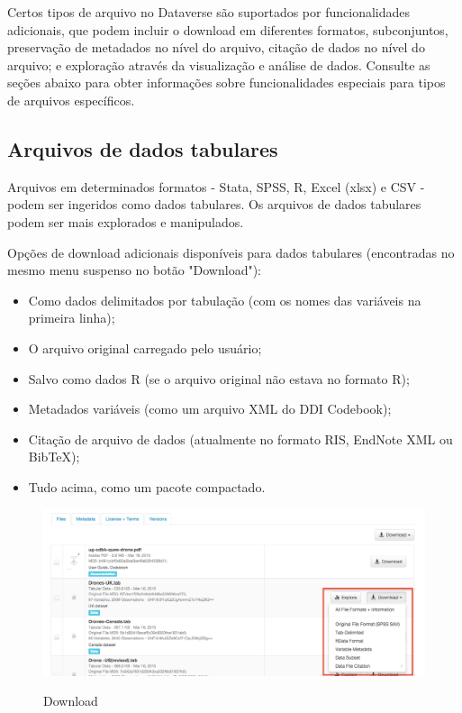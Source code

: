 \documentclass[12pt,hidelinks]{article}
\begin{document}
\qquad Certos tipos de arquivo no Dataverse são suportados por funcionalidades adicionais, que podem incluir o download em diferentes formatos, subconjuntos, preservação de metadados no nível do arquivo, citação de dados no nível do arquivo; e exploração através da visualização e análise de dados. Consulte as seções abaixo para obter informações sobre funcionalidades especiais para tipos de arquivos específicos.

    \subsection{Arquivos de dados tabulares}
    
\qquad Arquivos em determinados formatos - Stata, SPSS, R, Excel (xlsx) e CSV - podem ser ingeridos como dados tabulares. Os arquivos de dados tabulares podem ser mais explorados e manipulados.

Opções de download adicionais disponíveis para dados tabulares (encontradas no mesmo menu suspenso no botão "Download"):

\begin{itemize}

   \item Como dados delimitados por tabulação (com os nomes das variáveis na primeira linha);
   \item O arquivo original carregado pelo usuário;
   \item Salvo como dados R (se o arquivo original não estava no formato R);
   \item Metadados variáveis (como um arquivo XML do DDI Codebook);
   \item Citação de arquivo de dados (atualmente no formato RIS, EndNote XML ou BibTeX);
   \item Tudo acima, como um pacote compactado.

\end{itemize}
    
\begin{figure}[H]
\caption{Download}
                \centering
             \includegraphics[scale=0.3]{dttab.png}
            \label{Tabulares}
        \end{figure}
    
\end{document}
